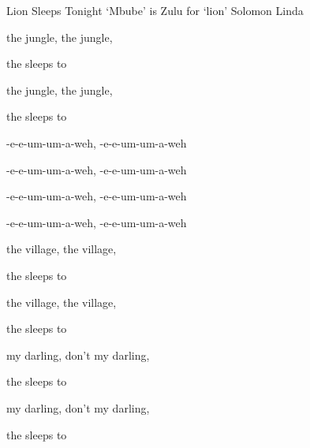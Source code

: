 \begin{SBSong}{Lion  Sleeps Tonight}
  {`Mbube' is Zulu for `lion'}
  {Solomon Linda}
  \begin{SBVerse}
     the jungle, the  jungle, 

    the  sleeps to  

    the jungle, the  jungle, 

    the  sleeps to  
  \end{SBVerse}
  \begin{SBChorus}
    -e-e-um-um-a-weh, -e-e-um-um-a-weh
  
	-e-e-um-um-a-weh, -e-e-um-um-a-weh
	
    -e-e-um-um-a-weh, -e-e-um-um-a-weh
  
	-e-e-um-um-a-weh, -e-e-um-um-a-weh
  \end{SBChorus}  
  \begin{SBVerse}
     the village, the  village, 

    the  sleeps to  
    
     the village, the  village, 

    the  sleeps to  
  \end{SBVerse}
  \begin{SBVerse}
    
     my darling, don't  my darling, 
    
    the  sleeps to  

     my darling, don't  my darling, 

    the  sleeps to  
  \end{SBVerse}
\end{SBSong}

